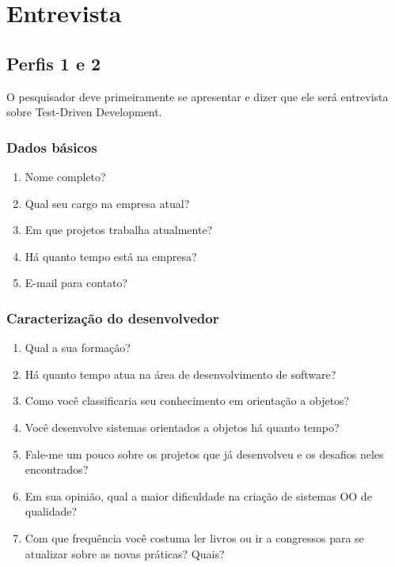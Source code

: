 \chapter{Entrevista}
\label{ape:entrevista}

\section{Perfis 1 e 2}

O pesquisador deve primeiramente se apresentar e dizer que ele será entrevista
sobre Test-Driven Development.

\subsection{Dados básicos}

\begin{enumerate}
	\item Nome completo?

	\item Qual seu cargo na empresa atual?
	
	\item Em que projetos trabalha atualmente?
	
	\item Há quanto tempo está na empresa?

	\item E-mail para contato?

\end{enumerate}

\subsection{Caracterização do desenvolvedor}

\begin{enumerate}
	\item Qual a sua formação?

	\item Há quanto tempo atua na área de desenvolvimento de software?

	\item Como você classificaria seu conhecimento em orientação a objetos?

	\item Você desenvolve sistemas orientados a objetos há quanto tempo?	

	\item Fale-me um pouco sobre os projetos que já desenvolveu e os desafios 
	neles encontrados?

	\item Em sua opinião, qual a maior dificuldade na criação de sistemas OO de
	qualidade?

	\item Com que frequência você costuma ler livros ou ir a congressos para se 
	atualizar sobre as novas práticas? Quais?

\end{enumerate}


